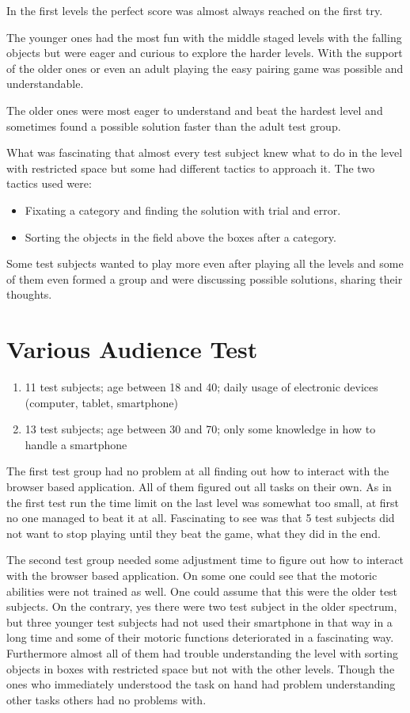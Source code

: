 In the first levels the perfect score was almost always reached on the first try.

The younger ones had the most fun with the middle staged levels with the falling objects but were eager and curious
to explore the harder levels. With the support of the older ones or even an adult playing the easy pairing game
was possible and understandable.

The older ones were most eager to understand and beat the hardest level and sometimes found a possible solution
faster than the adult test group.

What was fascinating that almost every test subject knew what to do in the level with restricted space but
some had different tactics to approach it. The two tactics used were:
\begin{itemize}
    \item Fixating a category and finding the solution with trial and error.
    \item Sorting the objects in the field above the boxes after a category.
\end{itemize}

Some test subjects wanted to play more even after playing all the levels and some of them even formed a group and
were discussing possible solutions, sharing their thoughts.

\section{Various Audience Test}
\begin{enumerate}
    \item 11 test subjects; age between 18 and 40; daily usage of electronic devices (computer, tablet, smartphone)
    \item 13 test subjects; age between 30 and 70; only some knowledge in how to handle a smartphone
\end{enumerate}

The first test group had no problem at all finding out how to interact with the browser based application.
All of them figured out all tasks on their own. As in the first test run the time limit on the last level was somewhat
too small, at first no one managed to beat it at all. Fascinating to see was that 5 test subjects did not want to stop
playing until they beat the game, what they did in the end.

The second test group needed some adjustment time to figure out how to interact with the browser based application.
On some one could see that the motoric abilities were not trained as well. One could assume that this were the older
test subjects. On the contrary, yes there were two test subject in the older spectrum, but three younger test subjects
had not used their smartphone in that way in a long time and some of their motoric functions deteriorated
in a fascinating way.
Furthermore almost all of them had trouble understanding the level with sorting objects in boxes with restricted space
but not with the other levels.
Though the ones who immediately understood the task on hand had problem understanding other tasks others had no problems with.

